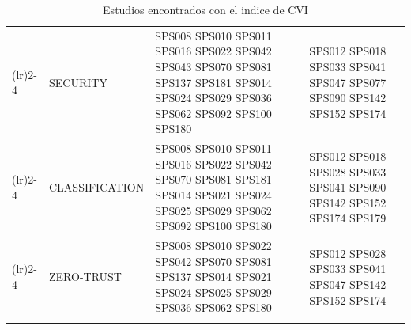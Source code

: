 \begin{table}[htbp]
\begin{tabularx}{\textwidth}{p{0.8cm}p{2.5cm}>{\raggedright\arraybackslash}X>{\raggedright\arraybackslash}X}
		\addlinespace[0.3em]
		\cmidrule(lr){2-4}	
											 & SECURITY         	& SPS008 SPS010 SPS011 SPS016 SPS022 SPS042 
																	  SPS043 SPS070 SPS081 SPS137 SPS181 SPS014 
																	  SPS024 SPS029 SPS036 SPS062 SPS092 SPS100 
																	  SPS180                   					& SPS012 SPS018 SPS033 SPS041 SPS047 SPS077 
																												  SPS090 SPS142 SPS152 SPS174                						\\
		\addlinespace[0.3em]
		\cmidrule(lr){2-4}	
											 & CLASSIFICATION        & SPS008 SPS010 SPS011 SPS016 SPS022 SPS042 
																	   SPS070 SPS081 SPS181 SPS014 SPS021 SPS024 
																	   SPS025 SPS029 SPS062 SPS092 SPS100 SPS180    & SPS012 SPS018 SPS028 SPS033 SPS041 SPS090 
																													  SPS142 SPS152 SPS174	SPS179                    					\\ 
		\addlinespace[0.3em]
		\cmidrule(lr){2-4}	
											 & ZERO-TRUST         	 & SPS008 SPS010 SPS022 SPS042 SPS070 SPS081 
																	   SPS137 SPS014 SPS021 SPS024 SPS025 SPS029 
																	   SPS036 SPS062 SPS180                   	 & SPS012 SPS028 SPS033 SPS041 SPS047 SPS142 
																												   SPS152 SPS174                    								\\
		\bottomrule
		\vspace{2pt}
	\end{tabularx}
	\caption{Estudios encontrados con el indice de CVI}\label{table:highest_CVI}
\end{table}

